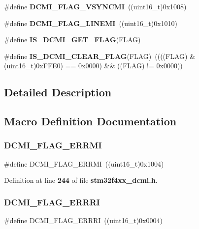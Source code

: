 \begin{DoxyCompactItemize}
\item 
\#define \textbf{ D\+C\+M\+I\+\_\+\+F\+L\+A\+G\+\_\+\+V\+S\+Y\+N\+C\+MI}~((uint16\+\_\+t)0x1008)
\item 
\#define \textbf{ D\+C\+M\+I\+\_\+\+F\+L\+A\+G\+\_\+\+L\+I\+N\+E\+MI}~((uint16\+\_\+t)0x1010)
\item 
\#define \textbf{ I\+S\+\_\+\+D\+C\+M\+I\+\_\+\+G\+E\+T\+\_\+\+F\+L\+AG}(F\+L\+AG)
\item 
\#define \textbf{ I\+S\+\_\+\+D\+C\+M\+I\+\_\+\+C\+L\+E\+A\+R\+\_\+\+F\+L\+AG}(F\+L\+AG)~((((F\+L\+AG) \& (uint16\+\_\+t)0x\+F\+F\+E0) == 0x0000) \&\& ((\+F\+L\+A\+G) != 0x0000))
\end{DoxyCompactItemize}


\subsection{Detailed Description}


\subsection{Macro Definition Documentation}
\mbox{\label{group__DCMI__Flags_ga32d9f0793f2c0758c05e07e273251e96}} 
\subsubsection{D\+C\+M\+I\+\_\+\+F\+L\+A\+G\+\_\+\+E\+R\+R\+MI}
{\footnotesize\ttfamily \#define D\+C\+M\+I\+\_\+\+F\+L\+A\+G\+\_\+\+E\+R\+R\+MI~((uint16\+\_\+t)0x1004)}



Definition at line \textbf{ 244} of file \textbf{ stm32f4xx\+\_\+dcmi.\+h}.

\mbox{\label{group__DCMI__Flags_ga38108fd82e34f856f2cc2289d5809143}} 
\subsubsection{D\+C\+M\+I\+\_\+\+F\+L\+A\+G\+\_\+\+E\+R\+R\+RI}
{\footnotesize\ttfamily \#define D\+C\+M\+I\+\_\+\+F\+L\+A\+G\+\_\+\+E\+R\+R\+RI~((uint16\+\_\+t)0x0004)}



